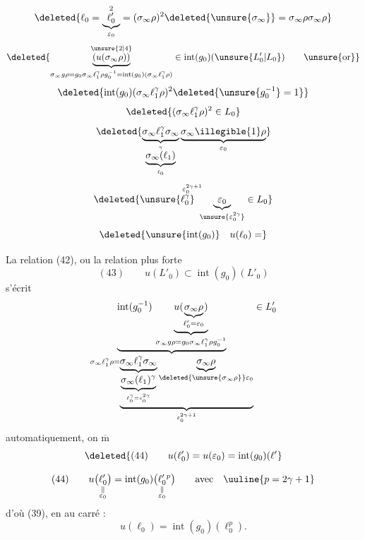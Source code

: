 \[
\deleted{\ell_0=\underbrace{\ell'_0}_{\varepsilon_0}^{2}=(\sigma_\infty\rho)^2\deleted{\unsure{\sigma_\infty}}=\sigma_\infty\rho\sigma_\infty\rho}
\]
\[
\deleted{\underbrace{(u(\sigma_\infty\rho))}_{
\substack{\sigma_\infty g\rho=g_0\sigma_\infty \ell_1^\gamma\rho g_0^{-1}
=\operatorname{int}(g_0)(\sigma_\infty \ell_1^\gamma\rho)}}^{\unsure{2|4}}
\in\operatorname{int}(g_0)(\unsure{L'_0|L_0})\qquad\text{\unsure{or}}}
\]
\[
\deleted{\operatorname{int}(g_0)(\sigma_\infty \ell_1^\gamma\rho)^2\deleted{\unsure{g_0^{-1}}=1}}
\]
\[
\deleted{(\sigma_\infty \ell_1^\gamma\rho)^2\in L_0}
\]
\[
\deleted{
\underbrace{\sigma_\infty \ell_1^\gamma\sigma_\infty}_{
    \underbrace{\sigma_\infty(\ell_1)}_{\ell_0}^{\gamma}}
  \underbrace{\sigma_\infty\illegible{1}\rho}_{\varepsilon_0}
}
\]
\[
\deleted{\overset{\varepsilon_0^{2\gamma+1}}{\unsure{\ell_0^\gamma}\ \underbrace{\varepsilon_0}_{\unsure{\varepsilon_0^{2\gamma}}}}\in L_0}
\]
\[
\deleted{\unsure{\operatorname{int}(g_0)}\quad u(\ell_0)=}
\]

La relation (42), ou la relation  plus forte
\[
(43)\qquad u(L'_0)\subset\operatorname{int}(g_0)(L'_0)
\]
s'écrit
\[
\underbrace{\operatorname{int}(g_0^{-1})\,
\underbrace{u(\underbrace{\sigma_\infty\rho}_{\ell'_0=\varepsilon_0})}_{
\sigma_\infty g\rho=g_0\sigma_\infty \ell_1^\gamma\rho g_0^{-1}}}_{
\sigma_\infty \ell_1^\gamma\rho
=\underbrace{\underbrace{\sigma_\infty \ell_1^\gamma\sigma_\infty}_{
 \underbrace{\sigma_\infty(\ell_1)^\gamma}_{\ell_0^\gamma=\varepsilon_0^{2\gamma}}}
\underbrace{\sigma_\infty\rho}_{\deleted{\unsure{\sigma_\infty\rho}}\varepsilon_0}}_{
\varepsilon_0^{2\gamma+1}}}
\in L'_0
\]
 automatiquement, on 
$\overline{\mathrm m}$
\[
\deleted{(44)\qquad u(\ell'_0)=u(\varepsilon_0)
=\operatorname{int}(g_0)(\ell'}
\]


\[
(44)\qquad
u\bigl(\underset{\substack{\Vert\\ \varepsilon_0}}{\ell'_0}\bigr)
 = \operatorname{int}(g_0)\bigl(\underset{\substack{\Vert\\ \varepsilon_0}}{\ell'_0}{}^{p}\bigr)
\qquad \text{avec}\quad \uuline{p=2\gamma+1}
\]
d'où (39),  en  au carré :
\[
u(\ell_0)=\operatorname{int}(g_0)(\ell_0^p).
\]

